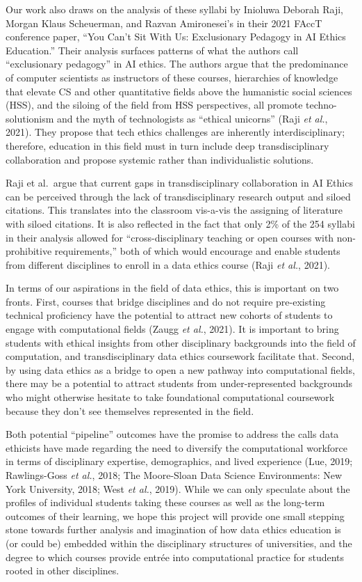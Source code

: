 \documentclass[
]{article}
\begin{document}
Our work also draws on the analysis of these syllabi by Inioluwa Deborah
Raji, Morgan Klaus Scheuerman, and Razvan Amironesei's in their 2021
FAccT conference paper, ``You Can't Sit With Us: Exclusionary Pedagogy
in AI Ethics Education.'' Their analysis surfaces patterns of what the
authors call ``exclusionary pedagogy'' in AI ethics. The authors argue
that the predominance of computer scientists as instructors of these
courses, hierarchies of knowledge that elevate CS and other quantitative
fields above the humanistic social sciences (HSS), and the siloing of
the field from HSS perspectives, all promote techno-solutionism and the
myth of technologists as ``ethical unicorns'' (Raji \emph{et al.},
2021). They propose that tech ethics challenges are inherently
interdisciplinary; therefore, education in this field must in turn
include deep transdisciplinary collaboration and propose systemic rather
than individualistic solutions.

Raji et al.~argue that current gaps in transdisciplinary collaboration
in AI Ethics can be perceived through the lack of transdisciplinary
research output and siloed citations. This translates into the classroom
vis-a-vis the assigning of literature with siloed citations. It is also
reflected in the fact that only 2\% of the 254 syllabi in their analysis
allowed for ``cross-disciplinary teaching or open courses with
non-prohibitive requirements,'' both of which would encourage and enable
students from different disciplines to enroll in a data ethics course
(Raji \emph{et al.}, 2021).

In terms of our aspirations in the field of data ethics, this is
important on two fronts. First, courses that bridge disciplines and do
not require pre-existing technical proficiency have the potential to
attract new cohorts of students to engage with computational fields
(Zaugg \emph{et al.}, 2021). It is important to bring students with
ethical insights from other disciplinary backgrounds into the field of
computation, and transdisciplinary data ethics coursework facilitate
that. Second, by using data ethics as a bridge to open a new pathway
into computational fields, there may be a potential to attract students
from under-represented backgrounds who might otherwise hesitate to take
foundational computational coursework because they don't see themselves
represented in the field.

Both potential ``pipeline'' outcomes have the promise to address the
calls data ethicists have made regarding the need to diversify the
computational workforce in terms of disciplinary expertise,
demographics, and lived experience (Lue, 2019; Rawlings-Goss \emph{et
al.}, 2018; The Moore-Sloan Data Science Environments: New York
University, 2018; West \emph{et al.}, 2019). While we can only speculate
about the profiles of individual students taking these courses as well
as the long-term outcomes of their learning, we hope this project will
provide one small stepping stone towards further analysis and
imagination of how data ethics education is (or could be) embedded
within the disciplinary structures of universities, and the degree to
which courses provide entrée into computational practice for students
rooted in other disciplines.
\end{document}
